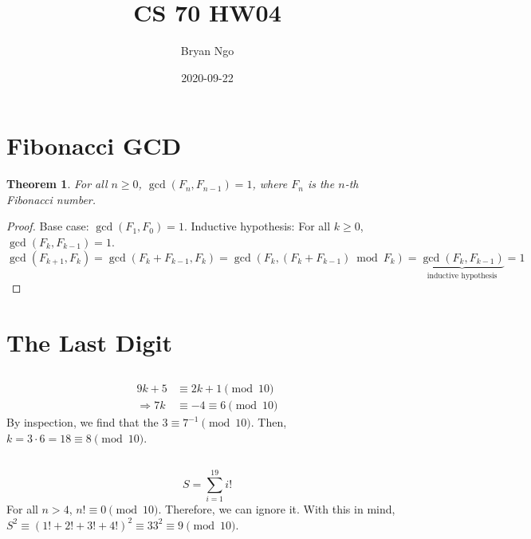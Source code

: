\documentclass{article}
\title{CS 70 HW04}
\author{Bryan Ngo}
\date{2020-09-22}
\newtheorem{theorem}{Theorem}
\begin{document}
\maketitle

\section{Fibonacci GCD}

\begin{theorem}
    For all \(n \geqslant 0\), \(\gcd(F_n, F_{n - 1}) = 1\), where \(F_n\) is the \(n\)-th Fibonacci number.
\end{theorem}
\begin{proof}
    Base case: \(\gcd(F_1, F_0) = 1\).
    Inductive hypothesis: For all \(k \geqslant 0\), \(\gcd(F_k, F_{k - 1}) = 1\).
    \begin{equation}
        \gcd(F_{k + 1}, F_k) = \gcd(F_k + F_{k - 1}, F_k) = \gcd(F_k, (F_k + F_{k - 1}) \bmod F_k) = \underbrace{\gcd(F_k, F_{k - 1})}_{\text{inductive hypothesis}} = 1
    \end{equation}
\end{proof}

\section{The Last Digit}

\subsection{}

\begin{align}
    9k + 5 &\equiv 2k + 1 \pmod{10} \\
    \Rightarrow 7k &\equiv -4 \equiv 6 \pmod{10}
\end{align}
By inspection, we find that the \(3 \equiv 7^{-1} \pmod{10}\).
Then, \(k = 3 \cdot 6 = 18 \equiv 8 \pmod{10}\).

\subsection{}

\begin{equation}
    S = \sum_{i = 1}^{19} i!
\end{equation}
For all \(n > 4\), \(n! \equiv 0 \pmod{10}\).
Therefore, we can ignore it.
With this in mind, \(S^2 \equiv (1! + 2! + 3! + 4!)^2 \equiv 33^2 \equiv 9 \pmod{10}\).
\end{document}
